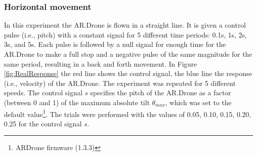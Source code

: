 \subsubsection{Horizontal movement}

In this experiment the AR.Drone is flown in a straight line. It is given a control pulse (i.e., pitch) with a constant signal
for 5 different time periods: 0.1s, 1s, 2s, 3s, and 5s. Each pulse is followed by a null signal for enough time for the AR.Drone to make a full stop and a negative pulse of the same magnitude for the same period,
resulting in a back and forth movement. In Figure \ref{fig:RealResponse}
 the red line shows the control signal, the blue line the response (i.e., velocity) of the AR.Drone. The experiment was repeated for 5 different speeds.
The control signal $s$ specifies the pitch of the AR.Drone as a factor (between 0 and 1) of the maximum absolute tilt $\theta_{max}$, which was set to the default value\footnote{ARDrone firmware (1.3.3)}. %
The trials were performed with the
values of 0.05, 0.10, 0.15, 0.20, 0.25 for the control signal $s$.

